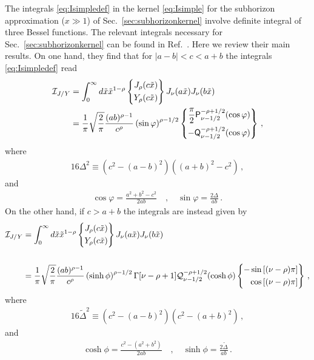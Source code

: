 \documentclass[a4paper,11pt]{article}
\numberwithin{equation}{section}
\begin{document}
The integrals \ref{eq:Isimpledef} in the kernel \ref{eq:Isimple} for the subhorizon approximation ($x\gg1$) of Sec.~\ref{sec:subhorizonkernel} involve definite integral of three Bessel functions. The relevant integrals necessary for Sec.~\ref{sec:subhorizonkernel} can be found in Ref.~\cite{threebesselI}. Here we review their main results. On one hand, they find that for $|a-b|<c<a+b$ the integrals \ref{eq:Isimpledef} read
\begin{align}
{\cal I}_{J/Y}&=\int_0^{\infty} d\tilde x \tilde x^{1-\rho}
\left\{ 
\begin{aligned}
    J_\rho(c\tilde x)\\
    Y_\rho(c\tilde x)
\end{aligned}
\right\}
J_{\nu}(a\tilde x)J_{\nu}(b\tilde x)\nonumber\\&=\frac{1}{\pi}\sqrt{\frac{2}{\pi}}\frac{(ab)^{\rho-1}}{c^\rho}\left(\sin\varphi\right)^{\rho-1/2}\left\{
\begin{aligned}
    \frac{\pi}{2}\mathsf{P}^{-\rho+1/2}_{\nu-1/2}(\cos\varphi)\\
    -\mathsf{Q}^{-\rho+1/2}_{\nu-1/2}(\cos\varphi)
\end{aligned}
\right\}\,,
\end{align}
where
\begin{align}
16\Delta^2\equiv\left(c^2-(a-b)^2\right)\left((a+b)^2-c^2\right)\,,
\end{align}
and
\begin{align}
\cos\varphi=\frac{a^2+b^2-c^2}{2ab}\quad,\quad\sin\varphi=\frac{2\Delta}{ab}\,.
\end{align}
On the other hand, if $c>a+b$ the integrals are instead given by
\begin{align}
{\cal I}_{J/Y}&=\int_0^{\infty} d\tilde x \tilde x^{1-\rho}
\left\{    
\begin{aligned}
    J_\rho(c\tilde x)\\
    Y_\rho(c\tilde x)
\end{aligned}
\right\}
J_{\nu}(a\tilde x)J_{\nu}(b\tilde x)\nonumber\\&
\nonumber\\&=\frac{1}{\pi}\sqrt{\frac{2}{\pi}}\frac{(ab)^{\rho-1}}{c^\rho}\left(\sinh\phi\right)^{\rho-1/2}\Gamma[\nu-\rho+1]{\cal Q}^{-\rho+1/2}_{\nu-1/2}(\cosh\phi)\left\{  
\begin{aligned}
    -\sin\left[(\nu-\rho)\pi\right]\\
    \cos\left[(\nu-\rho)\pi\right]
\end{aligned}
\right\}\,,
\end{align}
where
\begin{align}
16\tilde\Delta^2\equiv\left(c^2-(a-b)^2\right)\left(c^2-(a+b)^2\right)\,,
\end{align}
and
\begin{align}
\cosh\phi=\frac{c^2-(a^2+b^2)}{2ab}\quad,\quad\sinh\phi=\frac{2\tilde\Delta}{ab}\,.
\end{align}
\end{document}
